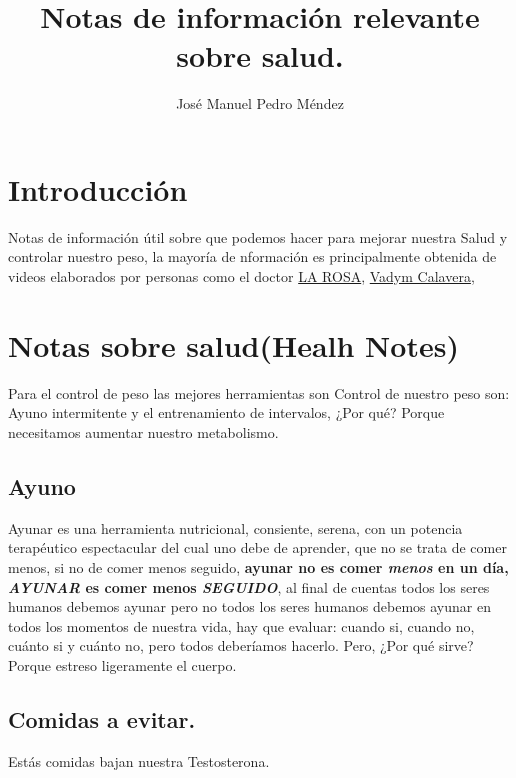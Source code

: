 \documentclass{article}
\title{Notas de información relevante sobre salud.}
\author{José Manuel Pedro Méndez}
\begin{document}
\maketitle

\section{Introducción}

Notas de información útil sobre que podemos hacer para mejorar nuestra Salud y controlar nuestro peso, la mayoría de nformación es principalmente obtenida de videos elaborados por personas como el doctor  \href{https://www.youtube.com/channel/UCqA4L7zgzJFS01F2km1yiDw}{LA ROSA}, \href{https://www.youtube.com/channel/UCuzmut0enwi-LrnyYwD0NCA}{Vadym Calavera},

\section{Notas sobre salud(Healh Notes)}

Para el control de peso las mejores herramientas son Control de nuestro peso son: Ayuno intermitente  y el entrenamiento de intervalos, ¿Por qué? Porque necesitamos aumentar nuestro metabolismo.

\subsection{Ayuno}

Ayunar es una herramienta nutricional, consiente, serena, con un potencia terapéutico espectacular del cual uno debe de aprender, que no se trata de comer menos, si no de comer menos seguido, \textbf{ayunar no es comer \textit{menos} en un día, \textit{AYUNAR} es comer menos \textit{SEGUIDO}}, al final de cuentas todos los seres humanos debemos ayunar pero no todos los seres humanos debemos ayunar en todos los momentos de nuestra vida, hay que evaluar: cuando si, cuando no, cuánto si y cuánto no, pero todos deberíamos hacerlo.
Pero, ¿Por qué sirve? Porque estreso ligeramente el cuerpo. 

\subsection{Comidas a evitar.}

Estás comidas bajan nuestra Testosterona.
\end{document}
